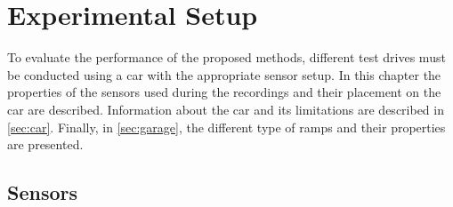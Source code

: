 \chapter{Experimental Setup}
\label{ch:ExperimentalSetup}

To evaluate the performance of the proposed methods, different test drives must be conducted using a car with the appropriate sensor setup.
In this chapter the properties of the sensors used during the recordings and their placement on the car are described.
Information about the car and its limitations are described in \cref{sec:car}.
Finally, in \cref{sec:garage}, the different type of ramps and their properties are presented.


\section{Sensors}
